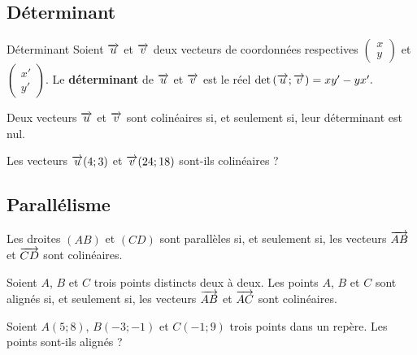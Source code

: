 \documentclass[11pt]{article}
\begin{document}
\subsection{Déterminant}
\begin{defi}{Déterminant}
  Soient $\overrightarrow{u}$ et $\overrightarrow{v}$ deux vecteurs de coordonnées respectives
  $\begin{pmatrix} x\\y\end{pmatrix}$ et $\begin{pmatrix}x'\\y'\end{pmatrix}$.
  Le \textbf{déterminant} de $\overrightarrow{u}$ et $\overrightarrow{v}$ est le réel $\det\left(\overrightarrow{u};
  \overrightarrow{v}\right)=xy'-yx'.$
\end{defi}
\begin{prop}
  Deux vecteurs $\overrightarrow{u}$ et $\overrightarrow{v}$ sont colinéaires si, et seulement si,
  leur déterminant est nul.
\end{prop}
\begin{app}
  Les vecteurs $\overrightarrow{u}(4; 3)$ et $\overrightarrow{v}(24; 18)$ sont-ils colinéaires ?
\end{app}
\subsection{Parallélisme}
\begin{prop}
  Les droites $(AB)$ et $(CD)$ sont parallèles si, et seulement si, les vecteurs
  $\overrightarrow{AB}$ et $\overrightarrow{CD}$ sont colinéaires.
\end{prop}
\begin{prop}
  Soient $A$, $B$ et $C$ trois points distincts deux à deux. Les points $A$, $B$
  et $C$ sont alignés si, et seulement si, les vecteurs
  $\overrightarrow{AB}$ et $\overrightarrow{AC}$ sont colinéaires.
\end{prop}
\begin{app}
  Soient $A(5; 8)$, $B(-3; -1)$ et $C(-1; 9)$ trois points dans un repère.
  Les points sont-ils alignés ?
\end{app}
\end{document}
